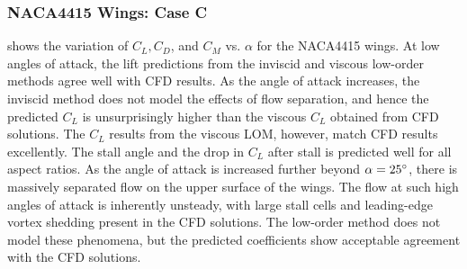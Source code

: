 \subsubsection{NACA4415 Wings: Case C}

shows the variation of $C_L, C_D$, and  $C_M$ vs. $\alpha$ for the NACA4415 wings.
At low angles of attack, the lift predictions from the inviscid and viscous low-order methods agree well with CFD results.
As the angle of attack increases, the inviscid method does not model the effects of flow separation, and hence the predicted $C_L$ is unsurprisingly higher than the viscous $C_L$ obtained from CFD solutions.
The $C_L$ results from the viscous LOM, however, match CFD results excellently.
The stall angle and the drop in $C_L$ after stall is predicted well for all aspect ratios.
As the angle of attack is increased further beyond $\alpha = 25^\circ{}$, there is massively separated flow on the upper surface of the wings. The flow at such high angles of attack is inherently unsteady, with large stall cells and leading-edge vortex shedding present in the CFD solutions. The low-order method does not model these phenomena, but the predicted coefficients show acceptable agreement with the CFD solutions.





